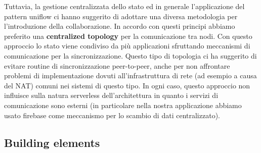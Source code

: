 Tuttavia, la gestione centralizzata dello stato ed in generale l'applicazione del pattern uniflow ci hanno suggerito di adottare una diversa metodologia per l'introduzione della collaborazione. In accordo con questi principi abbiamo preferito una \textbf{centralized topology} per la comunicazione tra nodi. Con questo approccio lo stato viene condiviso da pi\`u applicazioni sfruttando meccanismi di comunicazione per la sincronizzazione. Questo tipo di topologia ci ha suggerito di evitare routine di sincronizzazione peer-to-peer, anche per non affrontare problemi di implementazione dovuti all'infrastruttura di rete (ad esempio a causa del NAT) comuni nei sistemi di questo tipo. In ogni caso, questo approccio non influisce sulla natura serverless dell'architettura in quanto i servizi di comunicazione sono esterni (in particolare nella nostra applicazione abbiamo usato firebase come meccanismo per lo scambio di dati centralizzato).

\subsection{Building elements}\label{building_elements}

